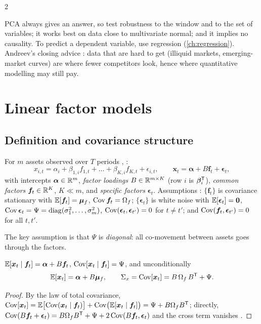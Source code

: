 \begin{paracol}{2}
\begin{finance}
PCA always gives an answer, so test robustness to the window and to the set of variables; it works best on data
close to multivariate normal; and it implies no causality. To predict a dependent variable, use regression
(\cref{ch:regression}). Andreev's closing advice : data that are hard to get (illiquid markets,
emerging-market curves) are where fewer competitors look, hence where quantitative modelling may still pay.
\end{finance}

\section{Linear factor models}\label{ch07:sec-lfm}

\subsection{Definition and covariance structure}
\begin{definition}\label{ch07:def-lfm}
For $m$ assets observed over $T$ periods , :
\begin{equation}\label{ch07:eq-lfm}
  x_{i,t}=\alpha_i+\beta_{1,i}f_{1,t}+\dots+\beta_{K,i}f_{K,t}+\epsilon_{i,t},\qquad
  \bm x_t=\bm\alpha+B\bm f_t+\bm\epsilon_t ,
\end{equation}
with intercepts $\bm\alpha\in\mathbb{R}^m$, \emph{factor loadings} $B\in\mathbb{R}^{m\times K}$ (row $i$ is $\bm\beta_i^{\mathsf T}$), \emph{common factors}
$\bm f_t\in\mathbb{R}^K$, $K\ll m$, and \emph{specific factors} $\bm\epsilon_t$. Assumptions :
$\{\bm f_t\}$ is covariance stationary with $\mathbb{E}[\bm f_t]=\bm\mu_f$, $\operatorname{Cov}\bm f_t=\Omega_f$; $\{\bm\epsilon_t\}$ is white noise with
$\mathbb{E}[\bm\epsilon_t]=\bm0$, $\operatorname{Cov}\bm\epsilon_t=\Psi=\operatorname{diag}(\sigma_1^2,\dots,\sigma_m^2)$, $\operatorname{Cov}(\bm\epsilon_t,\bm\epsilon_{t'})=0$ for $t\neq t'$; and
$\operatorname{Cov}(\bm f_t,\bm\epsilon_{t'})=0$ for all $t,t'$.
\end{definition}

The key assumption is that $\Psi$ is \emph{diagonal}: all co-movement between assets goes through the factors.

\begin{proposition}\label{ch07:prop-lfm}
$\mathbb{E}[\bm x_t\mid\bm f_t]=\bm\alpha+B\bm f_t$, $\operatorname{Cov}[\bm x_t\mid\bm f_t]=\Psi$, and unconditionally
\begin{equation}\label{ch07:eq-lfmcov}
  \mathbb{E}[\bm x_t]=\bm\alpha+B\bm\mu_f,\qquad \Sigma_x=\operatorname{Cov}[\bm x_t]=B\,\Omega_f\,B^{\mathsf T}+\Psi .
\end{equation}
\end{proposition}
\begin{proof}
By the law of total covariance, $\operatorname{Cov}[\bm x_t]=\mathbb{E}\bigl[\operatorname{Cov}(\bm x_t\mid\bm f_t)\bigr]+\operatorname{Cov}\bigl(\mathbb{E}[\bm x_t\mid\bm f_t]\bigr)=\Psi+B\Omega_fB^{\mathsf T}$;
directly, $\operatorname{Cov}(B\bm f_t+\bm\epsilon_t)=B\Omega_fB^{\mathsf T}+\Psi+2\operatorname{Cov}(B\bm f_t,\bm\epsilon_t)$ and the cross term vanishes .
\end{proof}


\end{paracol}
